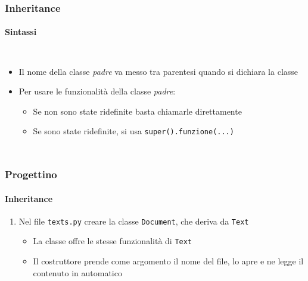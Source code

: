 \begin{contentframe}
    \frametitle{Inheritance}
    \framesubtitle{Sintassi}

    \begin{columns}
        \begin{itemize}
            \item Il nome della classe \textit{padre} va messo tra parentesi quando si dichiara la classe

            \bigskip
            \item Per usare le funzionalità della classe \textit{padre}:
            \begin{itemize}
                \item Se non sono state ridefinite basta chiamarle direttamente
                \item Se sono state ridefinite, si usa \texttt{super().funzione(...)}
            \end{itemize}
        \end{itemize}
        
        \centering
    \end{columns}
\end{contentframe}

\begin{exerciseframe}
    \frametitle{Progettino}
    \framesubtitle{Inheritance}

    \begin{enumerate}
        \item Nel file \texttt{texts.py} creare la classe \texttt{Document}, che deriva da \texttt{Text}
        \begin{itemize}
            \item La classe offre le stesse funzionalità di \texttt{Text}
            \item Il costruttore prende come argomento il nome del file, lo apre e ne legge il contenuto in automatico
        \end{itemize}
    \end{enumerate}
\end{exerciseframe}